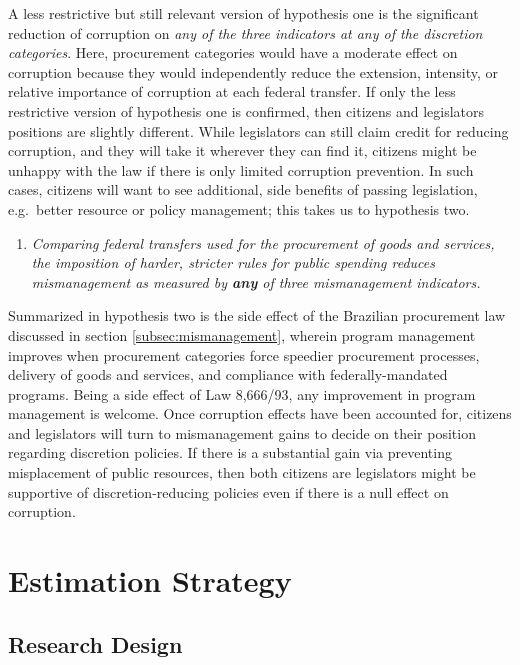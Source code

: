 \documentclass[11pt]{article}
\newcommand{\hypopen}{Comparing federal transfers used for the procurement of goods and services}
\begin{document}
A less restrictive but still relevant version of hypothesis one is the significant reduction of corruption on \emph{any of the three indicators at any of the discretion categories}. Here, procurement categories would have a moderate effect on corruption because they would independently reduce the extension, intensity, or relative importance of corruption at each federal transfer. If only the less restrictive version of hypothesis one is confirmed, then citizens and legislators positions are slightly different. While legislators can still claim credit for reducing corruption, and they will take it wherever they can find it, citizens might be unhappy with the law if there is only limited corruption prevention. In such cases, citizens will want to see additional, side benefits of passing legislation, e.g.~better resource or policy management; this takes us to hypothesis two.

\begin{enumerate}[label = H\arabic{enumi}:, font = \bfseries, labelindent = \parindent, leftmargin = *, resume] %
  \item \textit{\hypopen, the imposition of harder, stricter rules for public spending reduces mismanagement as measured by \textbf{any} of three mismanagement indicators.}
\end{enumerate}

Summarized in hypothesis two is the side effect of the Brazilian procurement law discussed in section \ref{subsec:mismanagement}, wherein program management improves when procurement categories force speedier procurement processes, delivery of goods and services, and compliance with federally-mandated programs. Being a side effect of Law 8,666/93, any improvement in program management is welcome. Once corruption effects have been accounted for, citizens and legislators will turn to mismanagement gains to decide on their position regarding discretion policies. If there is a substantial gain via preventing misplacement of public resources, then both citizens are legislators might be supportive of discretion-reducing policies even if there is a null effect on corruption.

\section{Estimation Strategy} \label{sec:methodology}

\subsection{Research Design} \label{subsec:methodology}
\end{document}
